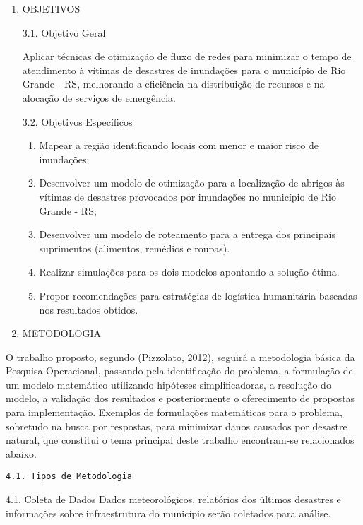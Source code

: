 \documentclass[
]{article}
\begin{document}
\begin{enumerate}
\def\labelenumi{\arabic{enumi}.}
\setcounter{enumi}{2}
\item
  OBJETIVOS

  3.1. Objetivo Geral

  Aplicar técnicas de otimização de fluxo de redes para minimizar o
  tempo de atendimento à vítimas de desastres de inundações para o
  município de Rio Grande - RS, melhorando a eficiência na distribuição
  de recursos e na alocação de serviços de emergência.

  3.2. Objetivos Específicos

  \begin{enumerate}
  \def\labelenumii{\arabic{enumii}.}
  \item
    Mapear a região identificando locais com menor e maior risco de
    inundações;
  \item
    Desenvolver um modelo de otimização para a localização de abrigos às
    vítimas de desastres provocados por inundações no município de Rio
    Grande - RS;
  \item
    Desenvolver um modelo de roteamento para a entrega dos principais
    suprimentos (alimentos, remédios e roupas).
  \item
    Realizar simulações para os dois modelos apontando a solução ótima.
  \item
    Propor recomendações para estratégias de logística humanitária
    baseadas nos resultados obtidos.
  \end{enumerate}
\item
  METODOLOGIA
\end{enumerate}

O trabalho proposto, segundo (Pizzolato, 2012), seguirá a metodologia
básica da Pesquisa Operacional, passando pela identificação do problema,
a formulação de um modelo matemático utilizando hipóteses
simplificadoras, a resolução do modelo, a validação dos resultados e
posteriormente o oferecimento de propostas para implementação. Exemplos
de formulações matemáticas para o problema, sobretudo na busca por
respostas, para minimizar danos causados por desastre natural, que
constitui o tema principal deste trabalho encontram-se relacionados
abaixo.

\begin{verbatim}
4.1. Tipos de Metodologia
\end{verbatim}

4.1. Coleta de Dados Dados meteorológicos, relatórios dos últimos
desastres e informações sobre infraestrutura do município serão
coletados para análise.
\end{document}
